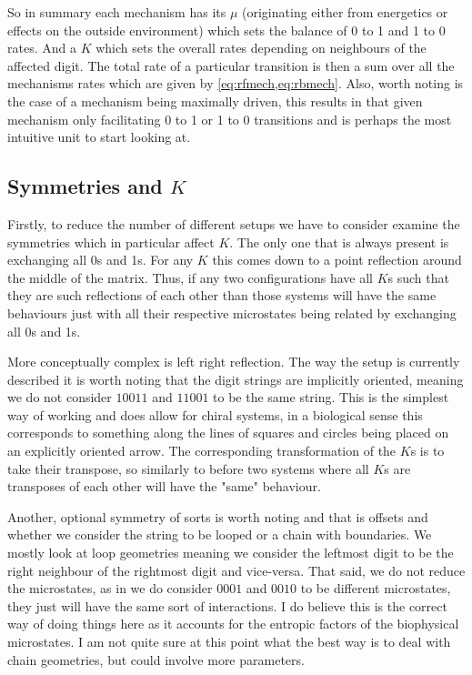 \documentclass[11pt]{article}
\begin{document}
\begin{tcolorbox}
	So in summary each mechanism has its $\mu$ (originating either from energetics or effects on the outside environment) which sets the balance of 0 to 1 and 1 to 0 rates.
	And a $K$ which sets the overall rates depending on neighbours of the affected digit.
	The total rate of a particular transition is then a sum over all the mechanisms rates which are given by \cref{eq:rfmech,eq:rbmech}.
	Also, worth noting is the case of a mechanism being maximally driven, this results in that given mechanism only facilitating 0 to 1 or 1 to 0 transitions and is perhaps the most intuitive unit to start looking at.
\end{tcolorbox}

\subsection{Symmetries and $K$}
Firstly, to reduce the number of different setups we have to consider examine the symmetries which in particular affect $K$.
The only one that is always present is exchanging all 0s and 1s.
For any $K$ this comes down to a point reflection around the middle of the matrix.
Thus, if any two configurations have all $K$s such that they are such reflections of each other than those systems will have the same behaviours just with all their respective microstates being related by exchanging all 0s and 1s.

More conceptually complex is left right reflection.
The way the setup is currently described it is worth noting that the digit strings are implicitly oriented, meaning we do not consider $10011$ and $11001$ to be the same string.
This is the simplest way of working and does allow for chiral systems, in a biological sense this corresponds to something along the lines of squares and circles being placed on an explicitly oriented arrow.
The corresponding transformation of the $K$s is to take their transpose, so similarly to before two systems where all $K$s are transposes of each other will have the "same" behaviour.

Another, optional symmetry of sorts is worth noting and that is offsets and whether we consider the string to be looped or a chain with boundaries.
We mostly look at loop geometries meaning we consider the leftmost digit to be the right neighbour of the rightmost digit and vice-versa.
That said, we do not reduce the microstates, as in we do consider $0001$ and $0010$ to be different microstates, they just will have the same sort of interactions.
I do believe this is the correct way of doing things here as it accounts for the entropic factors of the biophysical microstates.
I am not quite sure at this point what the best way is to deal with chain geometries, but could involve more parameters.
\end{document}
